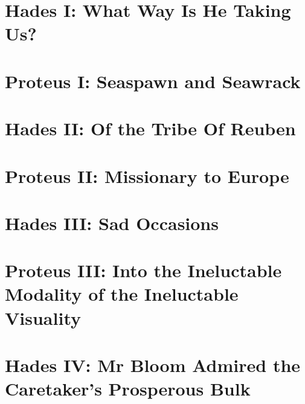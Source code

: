 \newpage


\setcounter{page}{1}

\section*{Hades I: What Way Is He Taking Us?}


\section*{Proteus I: Seaspawn and Seawrack}


\section*{Hades II: Of the Tribe Of Reuben}


\section*{Proteus II: Missionary to Europe}


\section*{Hades III: Sad Occasions}


\section*{Proteus III: Into the Ineluctable Modality of the Ineluctable Visuality}


\section*{Hades IV: Mr Bloom Admired the Caretaker's Prosperous Bulk}



